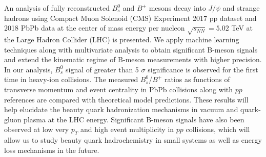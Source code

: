 % 
% 
%
An analysis of fully reconstructed $B^0_s$ and $B^+$ mesons decay into $J/\psi$ and strange hadrons using Compact Muon Solenoid (CMS) Experiment 2017 pp dataset and 2018 PbPb data at the center of mass energy per nucleon $\sqrt{s_{NN}} = 5.02$ TeV at the Large Hadron Collider (LHC) is presented. We apply machine learning techniques along with multivariate analysis to obtain significant B-meson signals and extend the kinematic regime of B-meson measurements with higher precision. In our analysis, $B^0_s$ signal of greater than 5 $\sigma$ significance is observed for the first time in heavy-ion collisions. The measured $B^0_s$/$B^+$ ratios as functions of transverse momentum and event centrality in PbPb collisions along with $pp$ references are compared with theoretical model predictions. These results will help elucidate the beauty quark hadronization mechanisms in vacuum and quark-gluon plasma at the LHC energy. Significant B-meson signals have also been observed at low very $p_T$ and high event multiplicity in $pp$ collisions, which will allow us to study beauty quark hadrochemistry in small systems as well as energy loss mechanisms in the future. 